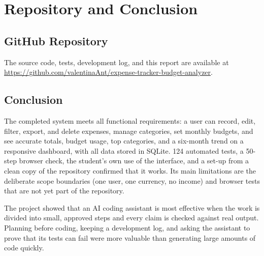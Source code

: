 \documentclass[11pt,a4paper]{article}
\newcommand{\repolink}{\url{https://github.com/valentinaAnt/expense-tracker-budget-analyzer}}
\begin{document}

\section{Repository and Conclusion}

\subsection{GitHub Repository}

The source code, tests, development log, and this report are available
at \repolink.

\subsection{Conclusion}

The completed system meets all functional requirements: a user can
record, edit, filter, export, and delete expenses, manage categories,
set monthly budgets, and see accurate totals, budget usage, top
categories, and a six-month trend on a responsive dashboard, with all
data stored in SQLite. 124 automated
tests, a 50-step browser check, the student's own use of the interface,
and a set-up from a clean copy of the repository confirmed that it
works. Its main limitations are the deliberate scope boundaries (one
user, one currency, no income) and browser tests that are not yet part
of the repository.

The project showed that an AI coding assistant is most effective when
the work is divided into small, approved steps and every claim is checked
against real output. Planning before coding, keeping a development log,
and asking the assistant to prove that its tests can fail were more
valuable than generating large amounts of code quickly.
\end{document}
